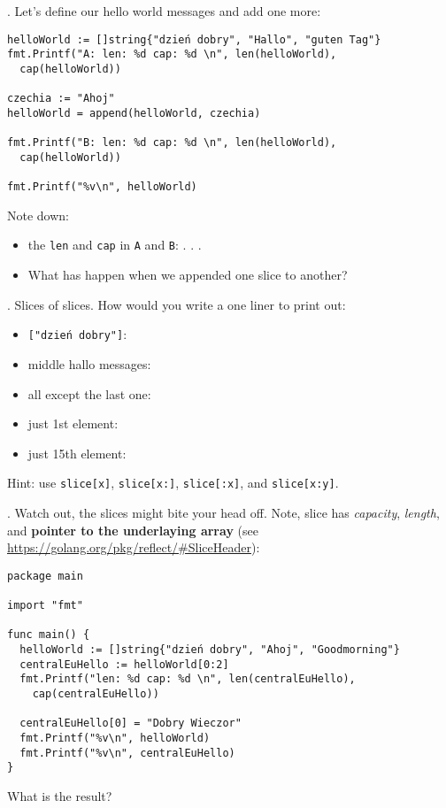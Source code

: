 \documentclass[11pt, letterpaper]{article}
\begin{document}
. Let's define our hello world messages and add one more:

\begin{verbatim}
helloWorld := []string{"dzień dobry", "Hallo", "guten Tag"}
fmt.Printf("A: len: %d cap: %d \n", len(helloWorld),
  cap(helloWorld))

czechia := "Ahoj"
helloWorld = append(helloWorld, czechia)

fmt.Printf("B: len: %d cap: %d \n", len(helloWorld),
  cap(helloWorld))

fmt.Printf("%v\n", helloWorld)
\end{verbatim}

\bigskip
Note down:
\begin{itemize}
    \item the \verb|len| and \verb|cap| in \verb|A| and \verb|B|: . . .
    \item What has happen when we appended one slice to another?
\end{itemize}

. Slices of slices. How would you write a one liner to print out:

\begin{itemize}
  \item \texttt{["dzień dobry"]}: \bigskip
  \item middle hallo messages: \bigskip
  \item all except the last one: \bigskip
  \item just 1st element: \bigskip
  \item just 15th element: \bigskip
\end{itemize}

Hint: use \texttt{slice[x]}, \texttt{slice[x:]}, \texttt{slice[:x]}, and \texttt{slice[x:y]}.

. Watch out, the slices might bite your head off. Note, slice has \emph{capacity}, \emph{length}, and \textbf{pointer to the underlaying array} (see \href{reflect.SliceHeader}{https://golang.org/pkg/reflect/\#SliceHeader}):
\begin{verbatim}
package main

import "fmt"

func main() {
  helloWorld := []string{"dzień dobry", "Ahoj", "Goodmorning"}
  centralEuHello := helloWorld[0:2]
  fmt.Printf("len: %d cap: %d \n", len(centralEuHello),
    cap(centralEuHello))

  centralEuHello[0] = "Dobry Wieczor"
  fmt.Printf("%v\n", helloWorld)
  fmt.Printf("%v\n", centralEuHello)
}
\end{verbatim}
What is the result?
\end{document}
